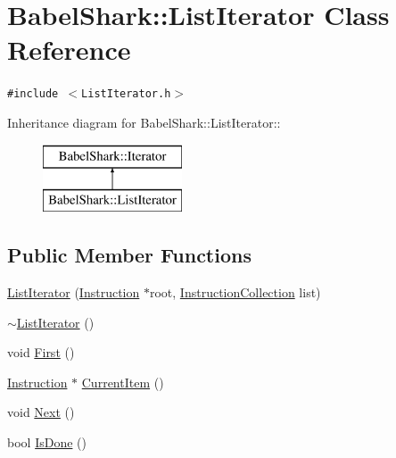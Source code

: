 \hypertarget{class_babel_shark_1_1_list_iterator}{
\section{BabelShark::ListIterator Class Reference}
\label{class_babel_shark_1_1_list_iterator}
}
{\tt \#include $<$ListIterator.h$>$}

Inheritance diagram for BabelShark::ListIterator::\begin{figure}[H]
\begin{center}
\leavevmode
\includegraphics[height=2cm]{class_babel_shark_1_1_list_iterator}
\end{center}
\end{figure}
\subsection*{Public Member Functions}
\begin{CompactItemize}
\item 
\hyperlink{class_babel_shark_1_1_list_iterator_d2805f8d13f76c5f7d0153571ab02baa}{ListIterator} (\hyperlink{class_babel_shark_1_1_instruction}{Instruction} $\ast$root, \hyperlink{namespace_babel_shark_b717a25ce0c899f2193ef8a7303a59bf}{InstructionCollection} list)
\item 
\hyperlink{class_babel_shark_1_1_list_iterator_9d5877a0af0b57936dffcc2113e5eb16}{$\sim$ListIterator} ()
\item 
void \hyperlink{class_babel_shark_1_1_list_iterator_87b086818286b6dd75934a8223a7adc4}{First} ()
\item 
\hyperlink{class_babel_shark_1_1_instruction}{Instruction} $\ast$ \hyperlink{class_babel_shark_1_1_list_iterator_2d1d087f5dc2154cde21b6e8a75d7ff1}{CurrentItem} ()
\item 
void \hyperlink{class_babel_shark_1_1_list_iterator_0a902e37bdb11742ed53edb631743ea4}{Next} ()
\item 
bool \hyperlink{class_babel_shark_1_1_list_iterator_44d4abc36f80db95a9e158af13688b2d}{IsDone} ()
\end{CompactItemize}


